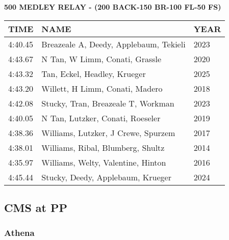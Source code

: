 \begin{table}[H]
\centering
\begin{minipage}[t]{0.6\textwidth}
\centering
\textbf{500 MEDLEY RELAY - (200 BACK-150 BR-100 FL-50 FS)}\\[0.1cm]
\begin{tabular}{@{}p{1.8cm}p{2.8cm}p{1.2cm}@{}}
\hline
    \textbf{TIME} & \textbf{NAME} & \textbf{YEAR} \\
\hline
    4:40.45 & Breazeale A, Deedy, Applebaum, Tekieli & 2023 \\
    4:43.67 & N Tan, W Limm, Conati, Grassle & 2020 \\
    4:43.32 & Tan, Eckel, Headley, Krueger & 2025 \\
    4:43.20 & Willett, H Limm, Conati, Madero & 2018 \\
    4:42.08 & Stucky, Tran, Breazeale T, Workman & 2023 \\
    4:40.05 & N Tan, Lutzker, Conati, Roeseler & 2019 \\
    4:38.36 & Williams, Lutzker, J Crewe, Spurzem & 2017 \\
    4:38.01 & Williams, Ribal, Blumberg, Shultz & 2014 \\
    4:35.97 & Williams, Welty, Valentine, Hinton & 2016 \\
    4:45.44 & Stucky, Deedy, Applebaum, Krueger & 2024 \\
\hline
\end{tabular}
\end{minipage}
\end{table}


\newpage

\subsection{CMS at PP}
\subsubsection{Athena}

